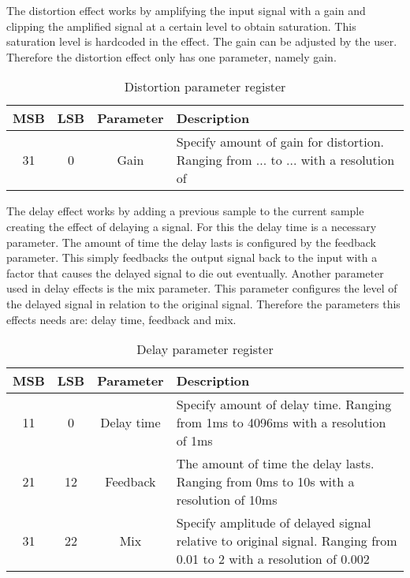 The distortion effect works by amplifying the input signal with a gain and clipping the amplified signal at a certain level to obtain saturation. This saturation level is hardcoded in the effect. The gain can be adjusted by the user. Therefore the distortion effect only has one parameter, namely gain.

\begin{table}[h!]
    \centering
    \begin{tabular}{|c|c|c|p{3.5in}|}
        \hline
        MSB & LSB & Parameter & Description\\
        \hline
        31 & 0 & Gain & Specify amount of gain for distortion. Ranging from ... to ... with a resolution of\\
        \hline
    \end{tabular}
    \caption{Distortion parameter register}
    \label{table:distortion-effect-parameters}
\end{table}

The delay effect works by adding a previous sample to the current sample creating the effect of delaying a signal. For this the delay time is a necessary parameter. The amount of time the delay lasts is configured by the feedback parameter. This simply feedbacks the output signal back to the input with a factor that causes the delayed signal to die out eventually. Another parameter used in delay effects is the mix parameter. This parameter configures the level of the delayed signal in relation to the original signal. Therefore the parameters this effects needs are: delay time, feedback and mix. 

\begin{table}[h!]
    \centering
    \begin{tabular}{|c|c|c|p{3.5in}|}
        \hline
        MSB & LSB & Parameter & Description\\
        \hline
        11 & 0 & Delay time & Specify amount of delay time. Ranging from 1ms to 4096ms with a resolution of 1ms\\
        \hline
        21 & 12 & Feedback & The amount of time the delay lasts. Ranging from 0ms to 10s with a resolution of 10ms\\
        \hline
        31 & 22 & Mix & Specify amplitude of delayed signal relative to original signal. Ranging from 0.01 to 2 with a resolution of 0.002\\
        \hline
    \end{tabular}
    \caption{Delay parameter register}
    \label{table:delay-effect-parameters}
\end{table}

